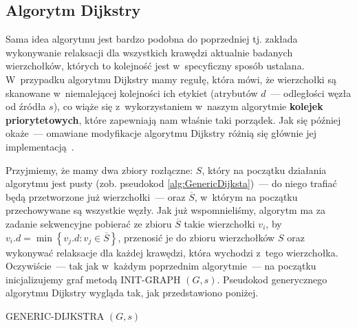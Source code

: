 \subsection{Algorytm Dijkstry}
\label{sub:dijkstraAlgorithm}

Sama idea algorytmu jest bardzo podobna do poprzedniej tj. zakłada wykonywanie relaksacji dla wszystkich krawędzi aktualnie badanych wierzchołków, których to kolejność jest w~specyficzny sposób ustalana. W~przypadku algorytmu Dijkstry mamy regułę, która mówi, że wierzchołki są skanowane w~niemalejącej kolejności ich etykiet (atrybutów $d$~--- odległości węzła od źródła $s$), co wiąże się z~wykorzystaniem w~naszym algorytmie \textbf{kolejek priorytetowych}, które zapewniają nam właśnie taki porządek. Jak się później okaże~--- omawiane modyfikacje algorytmu Dijkstry różnią się głównie jej implementacją~\cite[$2.1$]{OR}.

Przyjmiemy, że mamy dwa zbiory rozłączne: $S$, który na początku działania algorytmu jest pusty (zob. pseudokod \ref{alg:GenericDijksta})~--- do niego trafiać będą przetworzone już wierzchołki~--- oraz $\overline{S}$, w~którym na początku przechowywane są wszystkie węzły. Jak już wspomnieliśmy, algorytm ma za zadanie sekwencyjne pobierać ze zbioru $\overline{S}$ takie wierzchołki $v_{i}$, by $v_{i}.d = \min \left\{ v_{j}.d : v_{j} \in \overline{S} \right\}$, przenosić je do zbioru wierzchołków $S$ oraz wykonywać relaksacje dla każdej krawędzi, która wychodzi z~tego wierzchołka. Oczywiście~--- tak jak w~każdym poprzednim algorytmie~--- na początku inicjalizujemy graf metodą \textsc{INIT-GRAPH} $\left( G, s \right)$. Pseudokod generycznego algorytmu Dijkstry wygląda tak, jak przedstawiono poniżej.

\begin{pseudokod}[!htbp]
\DontPrintSemicolon
{}
\caption{ GENERIC-DIJKSTRA $\left( G, s \right)$\label{alg:GenericDijksta}}
\end{pseudokod}

